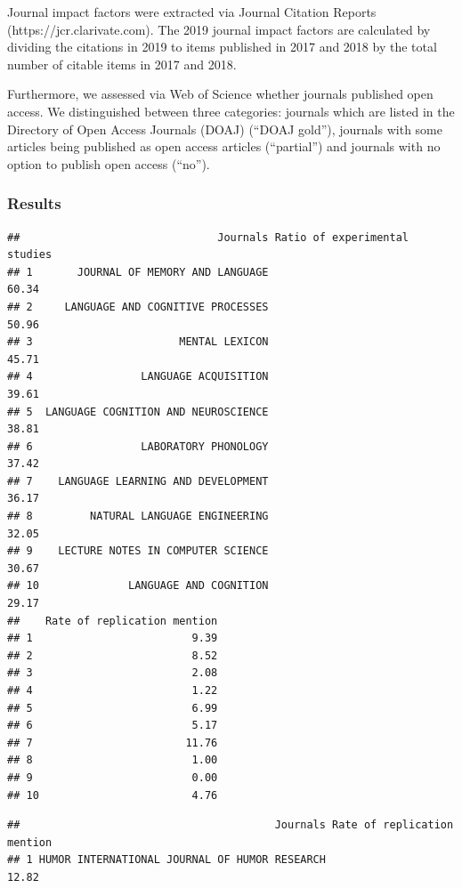 \documentclass[]{elsarticle} %
\begin{document}
Journal impact factors were extracted via Journal Citation Reports
(https://jcr.clarivate.com). The 2019 journal impact factors are
calculated by dividing the citations in 2019 to items published in 2017
and 2018 by the total number of citable items in 2017 and 2018.

Furthermore, we assessed via Web of Science whether journals published
open access. We distinguished between three categories: journals which
are listed in the Directory of Open Access Journals (DOAJ) (``DOAJ
gold''), journals with some articles being published as open access
articles (``partial'') and journals with no option to publish open
access (``no'').

\hypertarget{results}{%
\subsubsection{Results}\label{results}}

\begin{verbatim}
##                               Journals Ratio of experimental studies
## 1       JOURNAL OF MEMORY AND LANGUAGE                         60.34
## 2     LANGUAGE AND COGNITIVE PROCESSES                         50.96
## 3                       MENTAL LEXICON                         45.71
## 4                 LANGUAGE ACQUISITION                         39.61
## 5  LANGUAGE COGNITION AND NEUROSCIENCE                         38.81
## 6                 LABORATORY PHONOLOGY                         37.42
## 7    LANGUAGE LEARNING AND DEVELOPMENT                         36.17
## 8         NATURAL LANGUAGE ENGINEERING                         32.05
## 9    LECTURE NOTES IN COMPUTER SCIENCE                         30.67
## 10              LANGUAGE AND COGNITION                         29.17
##    Rate of replication mention
## 1                         9.39
## 2                         8.52
## 3                         2.08
## 4                         1.22
## 5                         6.99
## 6                         5.17
## 7                        11.76
## 8                         1.00
## 9                         0.00
## 10                        4.76
\end{verbatim}

\begin{verbatim}
##                                        Journals Rate of replication mention
## 1 HUMOR INTERNATIONAL JOURNAL OF HUMOR RESEARCH                       12.82
\end{verbatim}
\end{document}
